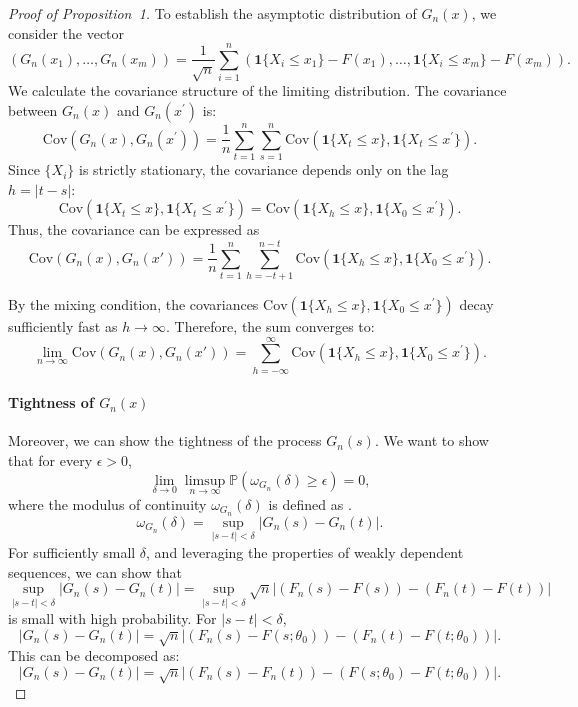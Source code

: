\documentclass[12pt]{article}
\begin{document}
\begin{proof}[Proof of Proposition~1]
To establish the asymptotic distribution of $ G_n(x) $, we consider the vector 
\[
  (G_n(x_1), \ldots, G_n(x_m)) =
  \frac{1}{\sqrt{n}} \sum_{i=1}^n
  \left(\mathbf{1}\{X_i \leq x_1\} - 
    F(x_1), \ldots, \mathbf{1}\{X_i \leq x_m\} - F(x_m)\right).
\]
We calculate the covariance structure of the limiting distribution. The 
covariance between $ G_n(x) $ and $ G_n(x^{\prime}) $ is:
\[
\text{Cov}(G_n(x), G_n(x^{\prime})) = \frac{1}{n} \sum_{t=1}^n \sum_{s=1}^n 
\text{Cov}\left(\mathbf{1}\{X_t \leq x\}, \mathbf{1}\{X_t \leq x^{\prime}\}\right).
\]
Since $ \{X_i\} $ is strictly stationary, the covariance depends only on the 
lag $ h = |t-s| $:
\[
\text{Cov}(\mathbf{1}\{X_t \leq x\}, \mathbf{1}\{X_t \leq x^{\prime}\}) = \text{Cov}(\mathbf{1}\{X_h \leq x\}, 
\mathbf{1}\{X_0 \leq x^{\prime}\}).
\]
Thus, the covariance can be expressed as
\[
\text{Cov}(G_n(x), G_n(x')) = \frac{1}{n} \sum_{t=1}^n \sum_{h=-t+1}^{n-t} 
\text{Cov}(\mathbf{1}\{X_h \leq x\}, 
\mathbf{1}\{X_0 \leq x^{\prime}\}).
\]


By the mixing condition, the covariances
$ \text{Cov}(\mathbf{1}\{X_h \leq x\}, \mathbf{1}\{X_0 \leq x^{\prime}\}) $ 
decay sufficiently fast as $ h \to \infty $. Therefore, the sum converges to:
\[
  \lim_{n \to \infty} \text{Cov}(G_n(x), G_n(x'))
  = \sum_{h=-\infty}^{\infty} \text{Cov}(\mathbf{1}\{X_h \leq x\}, 
  \mathbf{1}\{X_0 \leq x^{\prime}\}).
\]


\paragraph{Tightness of $G_n(x)$}

Moreover, we can show the tightness of the process $G_n(s)$. 
We want to show that for every $\epsilon > 0$,
\[
\lim_{\delta \to 0} \limsup_{n \to \infty} \mathbb{P}\left( \omega_{G_n}(\delta) 
\geq \epsilon \right) = 0,
\]
where the modulus of continuity $\omega_{G_n}(\delta)$ is defined as
\citep{billingsley2013convergence}.
\[
\omega_{G_n}(\delta) = \sup_{|s - t| < \delta} |G_n(s) - G_n(t)|.
\]
For sufficiently small $\delta$, and leveraging the properties of weakly 
dependent sequences, we can show that
\[
  \sup_{|s - t| < \delta} |G_n(s) - G_n(t)|
  = \sup_{|s - t| < \delta}  \sqrt{n}|(F_n(s) - F(s)) - (F_n(t) - F(t))|
\]
is small with high probability.
For $ |s - t| < \delta $,
\[
|G_n(s) - G_n(t)| = \sqrt{n} \left| (F_n(s) - F(s; \theta_0)) - (F_n(t) - 
F(t; \theta_0)) \right|.
\]
This can be decomposed as:
\[
|G_n(s) - G_n(t)| = \sqrt{n} \left| (F_n(s) - F_n(t)) - (F(s; \theta_0) - 
F(t; \theta_0)) \right|.
\]



\end{proof}
\end{document}
